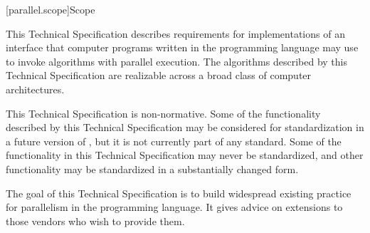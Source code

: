 
[parallel.scope]{Scope}

\pnum
This Technical Specification describes requirements for implementations of an
interface that computer programs written in the \Cpp programming language may
use to invoke algorithms with parallel execution. The algorithms described by
this Technical Specification are realizable across a broad class of
computer architectures.

\pnum
This Technical Specification is non-normative. Some of the functionality
described by this Technical Specification may be considered for standardization
in a future version of \Cpp, but it is not currently part of any \Cpp standard.
Some of the functionality in this Technical Specification may never be
standardized, and other functionality may be standardized in a substantially
changed form.

\pnum
The goal of this Technical Specification is to build widespread existing
practice for parallelism in the \Cpp programming language. It gives
advice on extensions to those vendors who wish to provide them.
